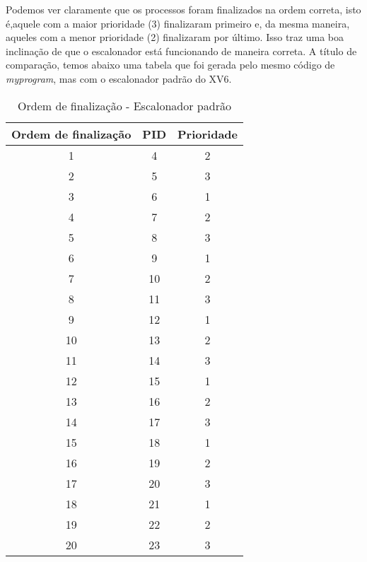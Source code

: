 \documentclass{article}
\begin{document}
Podemos ver claramente que os processos foram finalizados na ordem correta,
isto é,aquele com a maior prioridade (3) finalizaram primeiro e, da mesma
maneira, aqueles com a menor prioridade (2) finalizaram por último. Isso traz
uma boa inclinação de que o escalonador está funcionando de maneira correta. A
título de comparação, temos abaixo uma tabela que foi gerada pelo mesmo código
de \textit{myprogram}, mas com o escalonador padrão do XV6.

\begin{table}[H]
      \centering
      \begin{tabular}{|c|c|c|}
            \hline
            \textbf{Ordem de finalização} & \textbf{PID} & \textbf{Prioridade}
            \\
            \hline
            1                             & 4            & 2
            \\
            2                             & 5            & 3
            \\
            3                             & 6            & 1
            \\
            4                             & 7            & 2
            \\
            5                             & 8            & 3
            \\
            6                             & 9            & 1
            \\
            7                             & 10           & 2
            \\
            8                             & 11           & 3
            \\
            9                             & 12           & 1
            \\
            10                            & 13           & 2
            \\
            11                            & 14           & 3
            \\
            12                            & 15           & 1
            \\
            13                            & 16           & 2
            \\
            14                            & 17           & 3
            \\
            15                            & 18           & 1
            \\
            16                            & 19           & 2
            \\
            17                            & 20           & 3
            \\
            18                            & 21           & 1
            \\
            19                            & 22           & 2
            \\
            20                            & 23           & 3
            \\
            \hline
      \end{tabular}
      \caption{Ordem de finalização - Escalonador padrão}
      \label{tab:tabela_indexada}
\end{table}
\end{document}
